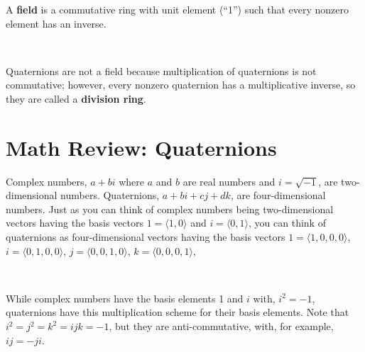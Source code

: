\documentclass[12pt]{article}
\begin{document}
\begin{spacing}{1.2}
A {\bf field} is a commutative ring with unit element (``1'') such that every nonzero element has an inverse.  

\

Quaternions are not a field because multiplication of quaternions is not commutative; however, every nonzero quaternion has a multiplicative inverse, so they are called a {\bf division ring}.

\section{Math Review:  Quaternions}

Complex numbers, $a+bi$ where $a$ and $b$ are real numbers and $i = \sqrt{-1}$, are two-dimensional numbers.  Quaternions, $a + bi + cj + dk$, are four-dimensional numbers.  Just as you can think of complex numbers being two-dimensional vectors having the basis vectors $1 = \langle 1,0 \rangle$ and $i = \langle 0,1 \rangle$, you can think of quaternions as four-dimensional vectors having the basis vectors 
$1 = \langle 1,0,0,0 \rangle$, 
$i = \langle 0,1,0,0 \rangle$, 
$j = \langle 0,0,1,0 \rangle$, 
$k = \langle 0,0,0,1 \rangle$, 

\

While complex numbers have the basis elements 1 and $i$ with, $i^2 = -1$, quaternions have this multiplication scheme for their basis elements.  Note that $i^2 = j^2 = k^2 = ijk = -1$, but they are anti-commutative, with, for example, $ij = -ji$.

\

\hfil{}
\hfil
{}
\hfil
{}
\end{spacing}
\end{document}

